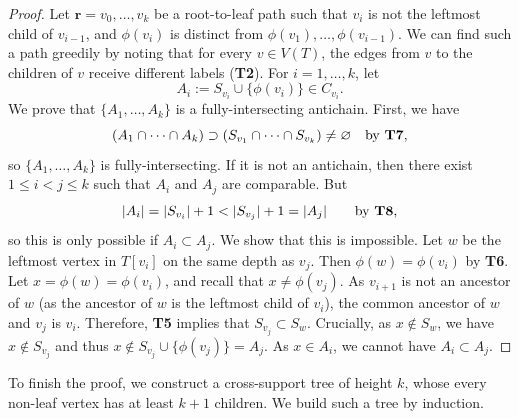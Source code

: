 \documentclass[11pt]{article}
\theoremstyle{definition}
\begin{document}
\begin{proof}
Let $\mathbf{r}=v_0,\dots,v_k$ be a root-to-leaf path such that $v_i$ is not the leftmost child of $v_{i-1}$, and $\phi(v_i)$ is distinct from $\phi(v_1),\dots,\phi(v_{i-1})$. We can find such a path greedily by noting that for every $v\in V(T)$, the edges from $v$ to the children of $v$ receive different labels (\textbf{T2}). For $i=1,\dots,k$, let 
$$A_i:=S_{v_i}\cup\{\phi(v_i)\}\in C_{v_i}.$$ We prove that $\{A_1,\dots,A_k\}$ is a fully-intersecting antichain. First, we have
$$(A_1\cap \dots \cap A_k)\supset (S_{v_1}\cap\dots \cap S_{v_k})\neq \varnothing \quad\text{by \textbf{T7}},$$
so $\{A_1,\dots,A_k\}$ is fully-intersecting. If it is not an antichain, then there exist $1\leq i<j\leq k$ such that $A_i$ and $A_j$ are comparable. But
$$|A_i|=|S_{v_i}|+1<|S_{v_j}|+1=|A_j|\hspace{20pt}\mbox{by \textbf{T8}},$$
so this is only possible if $A_i\subset A_j$. We show that this is impossible. Let $w$ be the leftmost vertex in $T[v_i]$ on the same depth as $v_j$. Then $\phi(w)=\phi(v_i)$ by  \textbf{T6}. Let $x=\phi(w)=\phi(v_i)$, and recall that $x\neq \phi(v_j)$. As $v_{i+1}$ is not an ancestor of $w$ (as the ancestor of $w$ is the leftmost child of $v_i$), the common ancestor of $w$ and $v_j$ is $v_i$. Therefore, \textbf{T5} implies that $S_{v_j}\subset S_w$. Crucially, as $x\not\in S_w$, we have $x\not\in S_{v_j}$ and thus $x\not\in S_{v_j}\cup\{\phi(v_j)\}=A_j$. As $x\in A_i$, we cannot have $A_i\subset A_j$.
\end{proof}

 To finish the proof, we construct a cross-support tree of height $k$, whose every non-leaf vertex has at least $k+1$ children. We build such a tree by induction.
\end{document}

